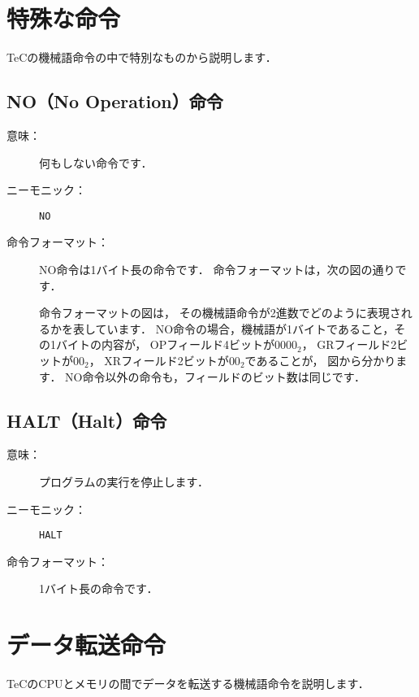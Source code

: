 \newpage
\section{特殊な命令}
TeCの機械語命令の中で特別なものから説明します．

\subsection{NO（No Operation）命令}
\begin{description}
\item[意味：]何もしない命令です．

\item[ニーモニック：]\texttt{NO}

\item[命令フォーマット：] NO命令は1バイト長の命令です．
  命令フォーマットは，次の図の通りです．


  命令フォーマットの図は，
  その機械語命令が2進数でどのように表現されるかを表しています．
  NO命令の場合，機械語が1バイトであること，その1バイトの内容が，
  OPフィールド4ビットが$0000_2$，
  GRフィールド2ビットが$00_2$，
  XRフィールド2ビットが$00_2$であることが，
  図から分かります．
  NO命令以外の命令も，フィールドのビット数は同じです．
\end{description}

\subsection{HALT（Halt）命令}
\begin{description}
\item[意味：]プログラムの実行を停止します．

\item[ニーモニック：]\texttt{HALT}

\item[命令フォーマット：]1バイト長の命令です．


\end{description}

\newpage
\section{データ転送命令}
TeCのCPUとメモリの間でデータを転送する機械語命令を説明します．

